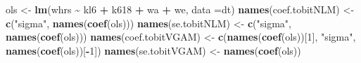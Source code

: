 \documentclass[
  12pt,
]{article}
\newenvironment{Shaded}{\begin{snugshade}}{\end{snugshade}}
\newcommand{\DataTypeTok}[1]{\textcolor[rgb]{0.13,0.29,0.53}{#1}}
\newcommand{\DecValTok}[1]{\textcolor[rgb]{0.00,0.00,0.81}{#1}}
\newcommand{\KeywordTok}[1]{\textcolor[rgb]{0.13,0.29,0.53}{\textbf{#1}}}
\newcommand{\NormalTok}[1]{#1}
\newcommand{\OperatorTok}[1]{\textcolor[rgb]{0.81,0.36,0.00}{\textbf{#1}}}
\newcommand{\StringTok}[1]{\textcolor[rgb]{0.31,0.60,0.02}{#1}}
\begin{document}
\begin{Shaded}
\begin{Highlighting}[]
\NormalTok{ols \textless{}{-}}\StringTok{ }\KeywordTok{lm}\NormalTok{(whrs }\OperatorTok{\textasciitilde{}}\StringTok{ }\NormalTok{kl6 }\OperatorTok{+}\StringTok{ }\NormalTok{k618 }\OperatorTok{+}\StringTok{ }\NormalTok{wa }\OperatorTok{+}\StringTok{ }\NormalTok{we, }\DataTypeTok{data =}\NormalTok{dt)}
\KeywordTok{names}\NormalTok{(coef.tobitNLM) \textless{}{-}}\StringTok{ }\KeywordTok{c}\NormalTok{(}\StringTok{"sigma"}\NormalTok{, }\KeywordTok{names}\NormalTok{(}\KeywordTok{coef}\NormalTok{(ols)))}
\KeywordTok{names}\NormalTok{(se.tobitNLM) \textless{}{-}}\StringTok{ }\KeywordTok{c}\NormalTok{(}\StringTok{"sigma"}\NormalTok{, }\KeywordTok{names}\NormalTok{(}\KeywordTok{coef}\NormalTok{(ols)))}
\KeywordTok{names}\NormalTok{(coef.tobitVGAM) \textless{}{-}}\StringTok{ }\KeywordTok{c}\NormalTok{(}\KeywordTok{names}\NormalTok{(}\KeywordTok{coef}\NormalTok{(ols))[}\DecValTok{1}\NormalTok{], }\StringTok{"sigma"}\NormalTok{, }\KeywordTok{names}\NormalTok{(}\KeywordTok{coef}\NormalTok{(ols))[}\OperatorTok{{-}}\DecValTok{1}\NormalTok{])}
\KeywordTok{names}\NormalTok{(se.tobitVGAM) \textless{}{-}}\StringTok{ }\KeywordTok{names}\NormalTok{(}\KeywordTok{coef}\NormalTok{(ols))}


\end{Highlighting}
\end{Shaded}
\end{document}
